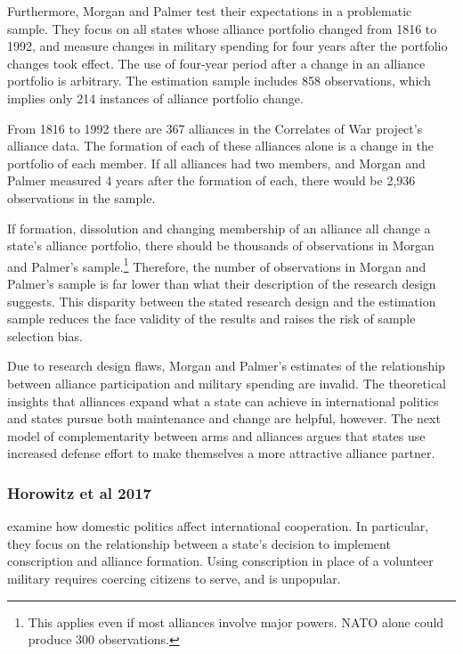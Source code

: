 \documentclass[12pt]{article}
\begin{document}
Furthermore, Morgan and Palmer test their expectations in a problematic sample.
They focus on all states whose alliance portfolio changed from 1816 to 1992, and measure changes in military spending for four years after the portfolio changes took effect.
The use of four-year period after a change in an alliance portfolio is arbitrary. 
The estimation sample includes 858 observations, which implies only 214 instances of alliance portfolio change.  


From 1816 to 1992 there are 367 alliances in the Correlates of War project's alliance data.
The formation of each of these alliances alone is a change in the portfolio of each member. 
If all alliances had two members, and Morgan and Palmer measured 4 years after the formation of each, there would be 2,936 observations in the sample. 


If formation, dissolution and changing membership of an alliance all change a state's alliance portfolio, there should be thousands of observations in Morgan and Palmer's sample.\footnote{This applies even if most alliances involve major powers. NATO alone could produce 300 observations.} 
Therefore, the number of observations in Morgan and Palmer's sample is far lower than what their description of the research design suggests.
This disparity between the stated research design and the estimation sample reduces the face validity of the results and raises the risk of sample selection bias. 


Due to research design flaws, Morgan and Palmer's estimates of the relationship between alliance participation and military spending are invalid. 
The theoretical insights that alliances expand what a state can achieve in international politics and states pursue both maintenance and change are helpful, however. 
The next model of complementarity between arms and alliances argues that states use increased defense effort to make themselves a more attractive alliance partner. 



\subsubsection{Horowitz et al 2017} 

\citet{Horowitzetal2017} examine how domestic politics affect international cooperation. 
In particular, they focus on the relationship between a state's decision to implement conscription and alliance formation. 
Using conscription in place of a volunteer military requires coercing citizens to serve, and is unpopular. 
\end{document}
